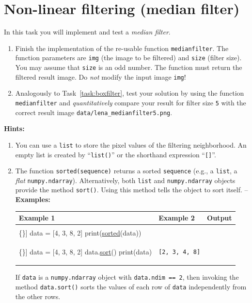 \documentclass[12pt,a4paper]{article}
\begin{document}
\section{Non-linear filtering (median filter)}
\label{task:medianfilter}
In this task you will implement and test a \emph{median filter}.
\begin{enumerate}
    \item Finish the implementation of the re-usable function \texttt{medianfilter}. The function parameters are \texttt{img} (the image to be filtered) and \texttt{size} (filter size). You may assume that \texttt{size} is an odd number. The function must return the filtered result image. Do \emph{not} modify the input image \texttt{img}!
    \item Analogously to Task~\ref{task:boxfilter}, test your solution by using the function \texttt{medianfilter} and \emph{quantitatively} compare your result for filter size \texttt{5} with the correct result image \texttt{data/lena\_medianfilter5.png}.
\end{enumerate}

\noindent\textbf{Hints:}
\begin{enumerate}
    \item You can use a \texttt{list} to store the pixel values of the filtering neighborhood. An empty list is created by ``\texttt{list()}'' or the shorthand expression ``\texttt{[]}''.
    \item The function \texttt{sorted(sequence)} returns a sorted \texttt{sequence} (e.g., a \texttt{list}, a \emph{flat} \texttt{numpy.ndarray}). Alternatively, both \texttt{list} and \texttt{numpy.ndarray} objects provide the method \texttt{sort()}. Using this method tells the object to sort itself. -- \textbf{Examples:}
    \begin{center}\begin{tabular}{p{}|p{}|p{}}
        \textbf{Example 1} & \textbf{Example 2} & \textbf{Output} \\
        \hline
        \begin{Verbatim}[commandchars=\\\{\}]
data = [4, 3, 8, 2]
print(\underline{sorted}(data))
        \end{Verbatim}
        &
        \begin{Verbatim}[commandchars=\\\{\}]
data = [4, 3, 8, 2]
data.\underline{sort}()
print(data)
        \end{Verbatim}
        &
        \begin{Verbatim}[]
[2, 3, 4, 8]
\end{Verbatim}
    \end{tabular}\end{center}
    If \texttt{data} is a \texttt{numpy.ndarray} object with \texttt{data.ndim == 2}, then invoking the method \texttt{data.sort()} sorts the values of each row of \texttt{data} independently from the other rows.
\end{enumerate}
\end{document}
